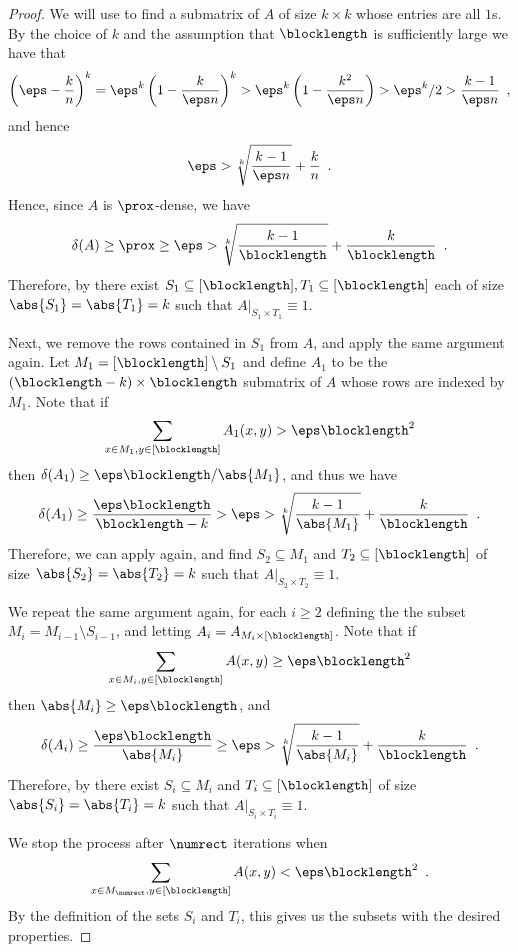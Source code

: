 \documentclass{toc}
\theoremstyle{plain}
\begin{document}
   \begin{proof}
        We will use  to find a submatrix
        of $A$ of size $k \times k$ whose entries are all $1$s.
        By the choice of $k$ and the assumption that $\blocklength$ is sufficiently large
        we have that
        \[
          \left(\eps - \frac{k}{n}\right)^k = \eps^k\left(1 - \frac{k}{\eps n}\right)^k > \eps^k\left(1 - \frac{k^2}{\eps n}\right) >\eps^k/2 > \frac{k-1}{\eps n}\enspace,
        \]
        and hence
        \[
          \eps > \sqrt[k]{\frac{k-1}{\eps n}} + \frac{k}{n}\enspace.
        \]
          Hence, since $A$ is $\prox$-dense, we have
          \[
            \delta(A) \geq \prox \geq \eps >
          \sqrt[k]{\frac{k-1}{\blocklength}} +
          \frac{k}{\blocklength}\enspace.
        \]
        Therefore, by  there exist
        $S_1 \subseteq [\blocklength], T_1 \subseteq [\blocklength]$
        each of size $\abs{S_1} = \abs{T_1} = k$ such that
        $A \vert_{S_1 \times T_1} \equiv 1$.

        Next, we remove the rows contained in $S_1$ from $A$,
        and apply the same argument again.
        Let $M_1 = [\blocklength] \setminus S_1$ and
        define $A_1$ to be the $(\blocklength-k) \times \blocklength$ submatrix of $A$
        whose rows are indexed by $M_1$.
        Note that if
        \[
          \sum_{x \in M_1, y \in [\blocklength]}A_1(x,y) > \eps \blocklength^2
        \]
        then $\delta(A_1) \geq {\eps \blocklength}/{\abs{M_1}}$,
        and thus we have
        \[
          \delta(A_1) \geq \frac{\eps \blocklength}{\blocklength-k} >
        \eps > \sqrt[k]{\frac{k-1}{\abs{M_1}}} +
        \frac{k}{\blocklength}\enspace.
      \]
      Therefore, we can apply  again, and
      find $S_2 \subseteq M_1$ and $T_2 \subseteq [\blocklength]$ of
      size $\abs{S_2} = \abs{T_2} = k$ such that
      $A \vert_{S_2 \times T_2} \equiv 1$.

        We repeat the same argument again,
        for each $i \geq 2$ defining the
        the subset $M_i = M_{i-1} \setminus S_{i-1}$,
        and letting $A_i = A_{M_i \times [\blocklength]}$.
        Note that if
        \[
          \sum_{x \in M_i, y \in [\blocklength]} A(x,y) \geq \eps \blocklength^2
        \]
        then $\abs{M_i} \geq \eps \blocklength$,
        and
        \[
          \delta(A_i) \geq \frac{\eps \blocklength}{\abs{M_i}} \geq \eps > \sqrt[k]{\frac{k-1}{\abs{M_i}}} + \frac{k}{\blocklength}\enspace.
        \]
        Therefore, by  there exist $S_i \subseteq M_i$ and $T_i \subseteq [\blocklength]$
        of size $\abs{S_i} = \abs{T_i} = k$ such that  $A \vert_{S_i \times T_i} \equiv 1$.

        We stop the process after $\numrect$ iterations when
        \[
          \sum_{x \in M_{\numrect}, y \in [\blocklength]} A(x,y) < \eps \blocklength^2\enspace.
          \]
          By the %
          definition
%
%
of the sets $S_i$ and $T_i$,                    %
this gives us the subsets with the desired properties.
    \end{proof}
\end{document}
